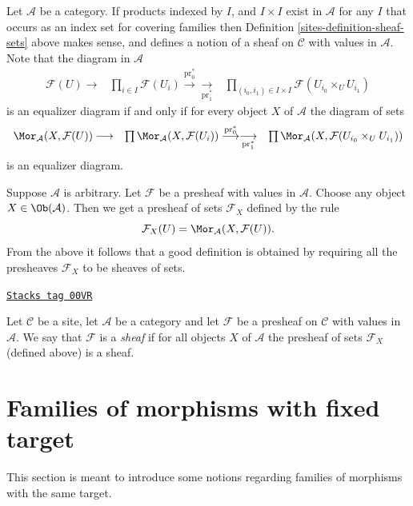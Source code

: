 Let $\mathcal{A}$ be a category. If products indexed by $I$, and
$I \times I$ exist in $\mathcal{A}$ for any $I$ that occurs as an index
set for covering families then Definition \ref{sites-definition-sheaf-sets}
above makes sense, and defines a notion of a sheaf on $\mathcal{C}$
with values in $\mathcal{A}$. Note that the diagram in $\mathcal{A}$
$$
\begin{array}{ccc}\mathcal{F}(U) \longrightarrow & \prod\nolimits_{i\in I}
\mathcal{F}(U_i)
\overset{\text{pr}_0^*}{\longrightarrow}\underset{\text{pr}_1^*}{\longrightarrow} & \prod\nolimits_{(i_0, i_1) \in I \times I}
\mathcal{F}(U_{i_0} \times_U U_{i_1})\end{array}
$$
is an equalizer diagram if and only if for every object $X$ of
$\mathcal{A}$ the diagram of sets
$$
\begin{array}{ccc}\Mor_\mathcal{A}(X, \mathcal{F}(U)) \longrightarrow & \prod
\Mor_\mathcal{A}(X, \mathcal{F}(U_i))
\overset{\text{pr}_0^*}{\longrightarrow}\underset{\text{pr}_1^*}{\longrightarrow} & \prod
\Mor_\mathcal{A}(X, \mathcal{F}(U_{i_0} \times_U U_{i_1}))\end{array}
$$
is an equalizer diagram.

\medskip\noindent
Suppose $\mathcal{A}$ is arbitrary.
Let $\mathcal{F}$ be a presheaf with values in $\mathcal{A}$.
Choose any object $X\in \Ob(\mathcal{A})$.
Then we get a presheaf of sets $\mathcal{F}_X$ defined
by the rule
$$
\mathcal{F}_X(U) = \Mor_\mathcal{A}(X, \mathcal{F}(U)).
$$
From the above it follows that a good definition is
obtained by requiring all the presheaves $\mathcal{F}_X$ to be
sheaves of sets.

\begin{definition}[Sheaf]
\label{sites-definition-sheaf}
\href{https://stacks.math.columbia.edu/tag/00VR}{\texttt{Stacks tag 00VR}}

Let $\mathcal{C}$ be a site, let $\mathcal{A}$ be a category
and let $\mathcal{F}$ be a presheaf on $\mathcal{C}$ with values in
$\mathcal{A}$. We say that $\mathcal{F}$ is a {\it sheaf}
if for all objects $X$ of $\mathcal{A}$ the presheaf of sets
$\mathcal{F}_X$ (defined above) is a sheaf.
\end{definition}

\section{Families of morphisms with fixed target}
\label{sites-section-refinements}
This section is meant to introduce some notions regarding
families of morphisms with the same target.


